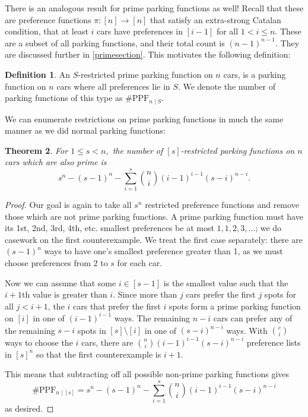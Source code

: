 \documentclass[12 pt]{amsart}
\newtheorem{theorem}{Theorem}[section]
\theoremstyle{definition} %
\newtheorem{definition}[theorem]{Definition}
\theoremstyle{remark} %
\begin{document}
There is an analogous result for prime parking functions as well! Recall that these are preference functions $\pi:[n]\to[n]$ that satisfy an extra-strong Catalan condition, that at least $i$ cars have preferences in $[i-1]$ for all $1<i\le n.$ These are a subset of all parking functions, and their total count is $(n-1)^{n-1}$. They are discussed further in \cref{primesection}. This motivates the following definition:

\begin{definition}
    An $S$-restricted prime parking function on $n$ cars, is a parking function on $n$ cars where all preferences lie in $S.$ We denote the number of parking functions of this type as $\# \mathrm{PPF}_{n\mid S}.$
\end{definition}

We can enumerate restrictions on prime parking functions in much the same manner as we did normal parking functions:

\begin{theorem}
    \label{thm:resPPFcount1}
    For $1 \le s < n,$ the number of $[s]$-restricted parking functions on $n$ cars which are also prime is 
    \[s^{n} - (s - 1)^{n} - \sum_{i = 1}^{s} \binom{n}{i} (i - 1)^{i - 1} (s - i)^{n - i}.\]
\end{theorem}

\begin{proof}
	Our goal is again to take all $s^n$ restricted preference functions and remove those which are not prime parking functions. A prime parking function must have its 1st, 2nd, 3rd, 4th, etc. smallest preferences be at most $1,1,2,3,\ldots$; we do casework on the first counterexample. We treat the first case separately: there are $(s-1)^n$ ways to have one's smallest preference greater than 1, as we must choose preferences from $2$ to $s$ for each car.
    
    Now we can assume that some $i\in [s-1]$ is the smallest value such that the $i+1$th value is greater than $i$. Since more than $j$ cars prefer the first $j$ spots for all $j < i+1$, the $i$ cars that prefer the first $i$ spots form a prime parking function on $[i]$ in one of $(i - 1)^{i - 1}$ ways. The remaining $n - i$ cars can prefer any of the remaining $s - i$ spots in $[s] \setminus [i]$ in one of $(s - i)^{n - i}$ ways. With $\binom{c}{i}$ ways to choose the $i$ cars, there are $\binom{n}{i} (i - 1)^{i - 1} (s - i)^{n - i}$ preference lists in $[s]^{n}$ so that the first counterexample is $i+1$.

    This means that subtracting off all possible non-prime parking functions gives
	\[
		\# \mathrm{PPF}_{n \mid [s]} = s^{n} - (s - 1)^{n} - \sum_{i = 1}^{s} \binom{n}{i} (i - 1)^{i - 1} (s - i)^{n - i}
	\]
    as desired.
\end{proof}
\end{document}
